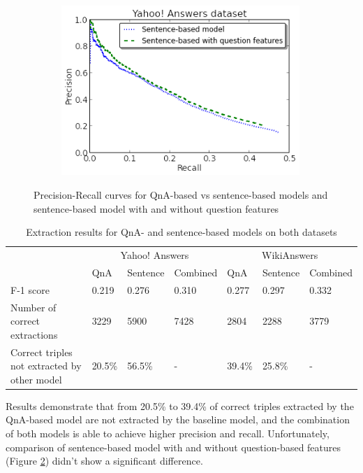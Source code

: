 \begin{figure}[h!]
\begin{subfigure}[h]{0.45\textwidth}
	\includegraphics[width=0.99\textwidth]{img/cqarelextract_noqf_vs_qf}
	\vspace{-1mm}
	\label{figure:pr:noqf_vs_qf}
\end{subfigure}
\vspace{-1mm}
\caption{Precision-Recall curves for QnA-based vs sentence-based models and sentence-based model with and without question features}
\label{figure:qna_relextract:pr_curve}
\end{figure}

\begin{table}[tbh]
\centering
\begin{tabular}{|p{6.6cm}||p{0.9cm}|p{1.4cm}|p{1.6cm}||p{0.9cm}|p{1.4cm}|p{1.6cm}|}
\hline
& \multicolumn{3}{|c||}{Yahoo! Answers} & \multicolumn{3}{|c|}{WikiAnswers}\\
\cline{2-7}
& QnA & Sentence & Combined & QnA & Sentence & Combined\\
\hline
F-1 score & 0.219 & 0.276 & 0.310 & 0.277 & 0.297 & 0.332\\
Number of correct extractions & 3229 & 5900 & 7428 & 2804 & 2288 & 3779 \\
Correct triples not extracted by other model & 20.5\% & 56.5\% & - & 39.4\% & 25.8\% & - \\
\hline
\end{tabular}
\caption{Extraction results for QnA- and sentence-based models on both datasets}
\label{table:qna_relextract:results}
\end{table}

Results demonstrate that from 20.5\% to 39.4\% of correct triples extracted by the QnA-based model are not extracted by the baseline model, and the combination of both models is able to achieve higher precision and recall.
Unfortunately, comparison of sentence-based model with and without question-based features (Figure \ref{figure:qna_relextract:pr_curve}) didn't show a significant difference.

